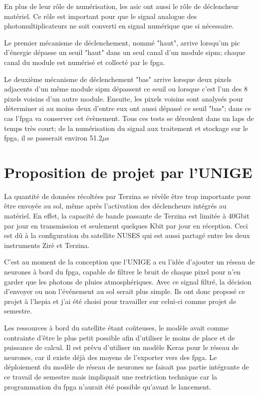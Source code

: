 En plus de leur rôle de numérisation, les \gls{asic} ont aussi le rôle de déclencheur matériel. 
Ce rôle est important pour que le signal analogue des photomultiplicateurs ne soit converti en signal numérique que si nécessaire. 

Le premier mécanisme de déclenchement, nommé "haut", arrive lorsqu'un pic d'énergie dépasse un seuil "haut" dans un seul canal
d'un module \gls{sipm}; chaque canal du module est numérisé et collecté par le \gls{fpga}. 

Le deuxième mécanisme de déclenchement "bas" arrive lorsque deux pixels adjacents d'un même module \gls{sipm}
dépassent ce seuil ou lorsque c'est l'un des 8 pixels voisins d'un autre module. 
Ensuite, les pixels voisins sont analysés pour déterminer si au moins deux d'entre eux ont aussi dépassé ce seuil "bas"; dans ce cas l'\gls{fpga} va conserver cet évènement.
Tous ces tests se déroulent dans un laps de temps très court; de la numérisation du signal aux traitement et stockage sur le \gls{fpga}, il se passerait environ 51.2$\mu$s

\section{Proposition de projet par l'UNIGE}

La quantité de données récoltées par Terzina se révèle être trop importante pour être envoyée au sol, même après l'activation des déclencheurs intégrés au matériel.
En effet, la capacité de bande passante de Terzina est limitée à 40Gbit par jour en transmission et seulement quelques Kbit par jour en réception.
Ceci est dû à la configuration du satellite NUSES qui est aussi partagé entre les deux instruments Zirè et Terzina.

C'est au moment de la conception que l'UNIGE a eu l'idée d'ajouter un réseau de neurones à bord du \gls{fpga}, capable de filtrer
le bruit de chaque pixel pour n'en garder que les photons de pluies atmosphériques. 
Avec ce signal filtré, la décision d'envoyer ou non l'événement au sol serait plus simple. 
Ils ont donc proposé ce projet à l'\gls{hepia} et j'ai été choisi pour travailler sur celui-ci comme projet de semestre.

Les ressources à bord du satellite étant coûteuses, le modèle avait comme contrainte d'être le plus petit possible 
afin d'utiliser le moins de place et de puissance de calcul.
Il est prévu d'utiliser un modèle Keras pour le réseau de neurones, car il existe déjà des moyens de l'exporter vers des \gls{fpga}.
Le déploiement du modèle de réseau de neurones ne faisait pas partie intégrante de ce travail de semestre mais impliquait une
restriction technique car la programmation du \gls{fpga} n'aurait été possible qu'avant le lancement.

